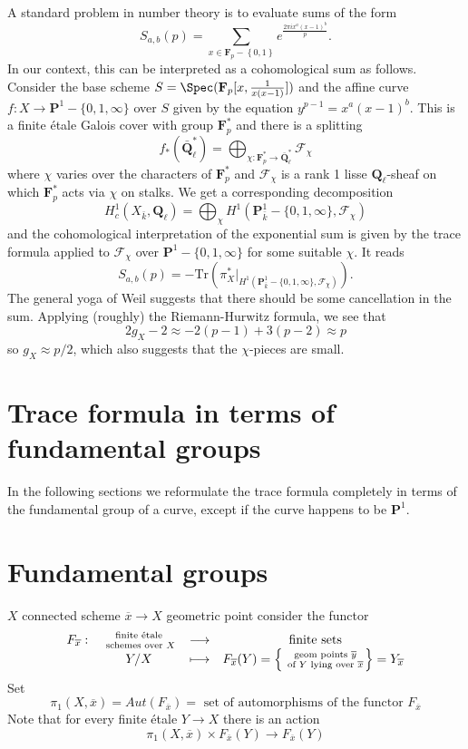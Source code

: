 \noindent
A standard problem in number theory is to evaluate sums of the form
$$
S_{a, b}(p) = \sum_{x\in \mathbf{F}_p - \left\{0, 1\right\}} e^{\frac{2\pi
ix^a(x - 1)^b}{p}}.
$$
In our context, this can be interpreted as a cohomological sum as follows.
Consider the base scheme
$S = \Spec(\mathbf{F}_p[x, \frac{1}{x(x - 1)}])$ and the affine curve
$f : X \to \mathbf{P}^1-\{0, 1, \infty\}$ over $S$ given by the equation
$y^{p - 1} = x^a(x - 1)^b$. This is a finite \'etale Galois cover with group
$\mathbf{F}_p^*$ and there is a splitting
$$
f_*(\bar{\mathbf{Q}}_\ell^*) =
\bigoplus_{\chi : \mathbf{F}_p^*\to \bar{\mathbf{Q}}_\ell^*} \mathcal{F}_\chi
$$
where $\chi$ varies over the characters of $\mathbf{F}_p^*$ and
$\mathcal{F}_\chi$ is a rank 1 lisse $\mathbf{Q}_\ell$-sheaf on which
$\mathbf{F}_p^*$ acts via $\chi$ on stalks. We get a corresponding decomposition
$$
H_c^1(X_{\bar k}, \mathbf{Q}_\ell) = \bigoplus_\chi H^1(\mathbf{P}_{\bar
k}^1-\{0, 1, \infty\}, \mathcal{F}_\chi)
$$
and the cohomological interpretation of the exponential sum is given by the
trace formula applied to $\mathcal{F}_\chi$ over $\mathbf{P}^1 - \{0, 1,
\infty\}$ for some suitable $\chi$. It reads
$$
S_{a, b}(p) =
-\text{Tr}(\pi_X^*
|_{H^1(\mathbf{P}_{\bar k}^1-\{0, 1, \infty\}, \mathcal{F}_\chi)}).
$$
The general yoga of Weil suggests that there should be some cancellation in the
sum. Applying (roughly) the Riemann-Hurwitz formula, we see that
$$
2g_X-2 \approx -2 (p-1) + 3(p-2) \approx p
$$
so $g_X\approx p/2$, which also suggests that the $\chi$-pieces are small.



\section{Trace formula in terms of fundamental groups}
\label{section-trace-formula-fundamental-group}

\noindent
In the following sections we reformulate the trace formula completely
in terms of the fundamental group of a curve, except if the curve
happens to be $\mathbf{P}^1$.




\section{Fundamental groups}
\label{section-fundamental-groups}

\noindent
$X$ connected scheme $\overline{x}\to X$ geometric
point consider the functor
$$
\begin{matrix}
F_{\overline{x}}: &
\text{ finite \'etale } \atop \text{ schemes over } X &
\longrightarrow & \text{ finite sets} \\
&
Y/X &
\longmapsto &
F_{\overline{x}}(Y) =
\left\{\text{ geom points }\overline y \atop \text{ of } Y
\text{ lying over }\overline{x}\right\} = Y_{\overline{x}}
\end{matrix}
$$
Set
$$
\pi_1(X, \overline{x})
=
Aut(F_{\overline{x}})
=
\text{ set of automorphisms of the functor }F_{\overline{x}}
$$
Note that for every finite \'etale $Y \to X$ there is an action
$$
\pi_1(X, \overline{x}) \times F_{\overline{x}}(Y) \to F_{\overline{x}}(Y)
$$

